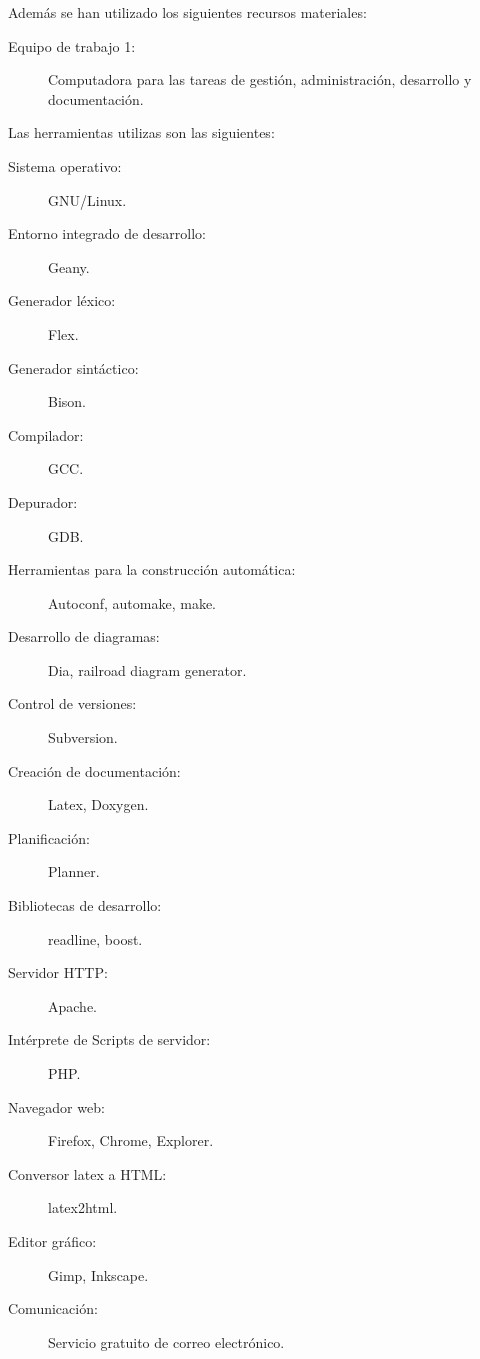 Además se han utilizado los siguientes recursos materiales:
\begin{description}
\item [Equipo de trabajo 1:] Computadora para las tareas de gestión, administración, desarrollo y documentación. 
\end{description}

Las herramientas utilizas son las siguientes:
\begin{description}
\item [Sistema operativo:] GNU/Linux. 
\item [Entorno integrado de desarrollo:] Geany.
\item [Generador léxico:] Flex.
\item [Generador sintáctico:] Bison.
\item [Compilador:] GCC.
\item [Depurador:] GDB.
\item [Herramientas para la construcción automática:] Autoconf, automake, make.
\item [Desarrollo de diagramas:] Dia, railroad diagram generator.
\item [Control de versiones:] Subversion.
\item [Creación de documentación:] Latex, Doxygen.
\item [Planificación:] Planner.
\item [Bibliotecas de desarrollo:] readline, boost. 
\item [Servidor HTTP: ] Apache.
\item [Intérprete de Scripts de servidor:] PHP.
\item [Navegador web:] Firefox, Chrome, Explorer.
\item [Conversor latex a HTML:] latex2html.
\item [Editor gráfico:] Gimp, Inkscape.
\item [Comunicación:] Servicio gratuito de correo electrónico. 
\end{description}

